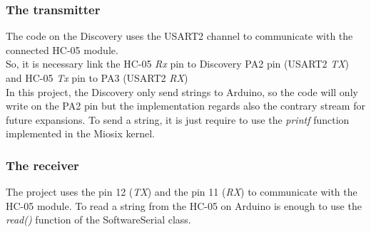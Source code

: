 \subsubsection{The transmitter}
The code on the Discovery uses the USART2 channel to communicate with the connected HC-05 module.\\
So, it is necessary link the HC-05 \textit{Rx} pin to Discovery PA2 pin (USART2 \textit{TX}) and HC-05 \textit{Tx} pin to PA3 (USART2 \textit{RX})\\
In this project, the Discovery only send strings to Arduino, so the code will only write on the PA2 pin but the implementation regards also the contrary stream for future expansions. To send a string, it is just require to use the \textit{printf} function implemented in the Miosix kernel.\\

\subsubsection{The receiver}
The project uses the pin 12 (\textit{TX}) and the pin 11 (\textit{RX}) to communicate with the HC-05 module. To read a string from the HC-05 on Arduino is enough to use the \textit{read()} function of the SoftwareSerial class.\\